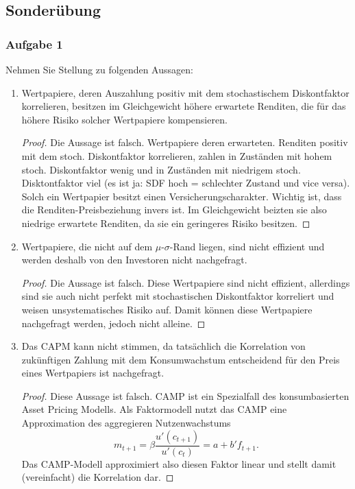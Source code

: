 \documentclass[12pt]{extreport} %
\theoremstyle{named}
\theoremstyle{nnamed}
\theoremstyle{itshape}
\theoremstyle{normal}
\begin{document}
\newpage

\subsection*{Sonderübung}

\subsubsection*{Aufgabe 1}
Nehmen Sie Stellung zu folgenden Aussagen:
\begin{enumerate}
	\item Wertpapiere, deren Auszahlung positiv mit dem stochastischem Diskontfaktor  korrelieren, besitzen im Gleichgewicht höhere erwartete Renditen, die für das höhere Risiko solcher Wertpapiere kompensieren.
		\begin{proof}
			Die Aussage ist falsch. Wertpapiere deren erwarteten. Renditen positiv mit dem stoch. Diskontfaktor korrelieren, zahlen in Zuständen mit hohem stoch. Diskontfaktor wenig und in Zuständen mit niedrigem stoch. Disktontfaktor viel (es ist ja: SDF hoch = schlechter Zustand und vice versa). Solch ein Wertpapier besitzt einen Versicherungscharakter. Wichtig ist, dass die Renditen-Preisbeziehung invers ist. Im Gleichgewicht beizten sie also niedrige erwartete Renditen, da sie ein geringeres Risiko besitzen.
		\end{proof}
	\item Wertpapiere, die nicht auf dem $\mu$-$\sigma$-Rand liegen, sind nicht effizient und werden deshalb von den Investoren nicht nachgefragt.
		\begin{proof}
			Die Aussage ist falsch. Diese Wertpapiere sind nicht effizient, allerdings sind sie auch nicht perfekt mit stochastischen Diskontfaktor korreliert und weisen unsystematisches Risiko auf. Damit können diese Wertpapiere nachgefragt werden, jedoch nicht alleine.
		\end{proof}
	\item Das CAPM kann nicht stimmen, da tatsächlich die Korrelation von zukünftigen Zahlung mit dem Konsumwachstum entscheidend für den Preis eines Wertpapiers ist nachgefragt.
		\begin{proof}
			Diese Aussage ist falsch. CAMP ist ein Spezialfall des konsumbasierten Asset Pricing Modells. Als Faktormodell nutzt das CAMP eine Approximation des aggregieren Nutzenwachstums
			$$ m_{t+1} = \beta \frac{u'(c_{t+1})}{u'(c_{t})} = a + b' f_{t+1}. $$ 
			Das CAMP-Modell approximiert also diesen Faktor linear und  stellt damit (vereinfacht) die Korrelation dar.

\end{proof}
\end{enumerate}
\end{document}
